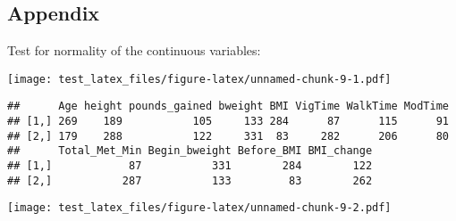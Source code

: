 \documentclass[]{article}
\begin{document}
\hypertarget{appendix}{%
\subsection{Appendix}\label{appendix}}

Test for normality of the continuous variables:

\texttt{[image: test\_latex\_files/figure-latex/unnamed-chunk-9-1.pdf]}

\begin{verbatim}
##      Age height pounds_gained bweight BMI VigTime WalkTime ModTime
## [1,] 269    189           105     133 284      87      115      91
## [2,] 179    288           122     331  83     282      206      80
##      Total_Met_Min Begin_bweight Before_BMI BMI_change
## [1,]            87           331        284        122
## [2,]           287           133         83        262
\end{verbatim}

\texttt{[image: test\_latex\_files/figure-latex/unnamed-chunk-9-2.pdf]}
\end{document}
